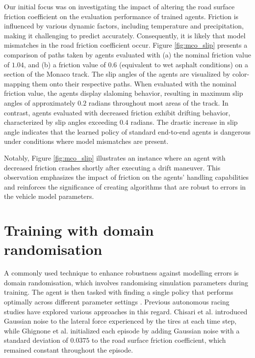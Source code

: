 Our initial focus was on investigating the impact of altering the road surface friction coefficient on the evaluation performance of trained agents.
Friction is influenced by various dynamic factors, including temperature and precipitation, making it challenging to predict accurately.
Consequently, it is likely that model mismatches in the road friction coefficient occur.
Figure \ref{fig:mco_slip} presents a comparison of paths taken by agents evaluated with (a) the nominal friction value of $1.04$, and (b) a friction value of $0.6$ (equivalent to wet asphalt conditions) on a section of the Monaco track. 
The slip angles of the agents are visualized by color-mapping them onto their respective paths. 
When evaluated with the nominal friction value, the agents display slaloming behavior, resulting in maximum slip angles of approximately $0.2$ radians throughout most areas of the track. 
In contrast, agents evaluated with decreased friction exhibit drifting behavior, characterized by slip angles exceeding $0.4$ radians. 
The drastic increase in slip angle indicates that the learned policy of standard end-to-end agents is dangerous under conditions where model mismatches are present.


Notably, Figure \ref{fig:mco_slip} illustrates an instance where an agent with decreased friction crashes shortly after executing a drift maneuver. 
This observation emphasizes the impact of friction on the agents' handling capabilities and reinforces the significance of creating algorithms that are robust to errors in the vehicle model parameters.




\section{Training with domain randomisation}

A commonly used technique to enhance robustness against modelling errors is domain randomisation, which involves randomising simulation parameters during training. 
The agent is then tasked with finding a single policy that performs optimally across different parameter settings \cite{Zhou2020}. 
Previous autonomous racing studies have explored various approaches in this regard. 
Chisari et al. \cite{Chisari2021} introduced Gaussian noise to the lateral force experienced by the tires at each time step, while Ghignone et al. \cite{Ghignone2022} initialized each episode by adding Gaussian noise with a standard deviation of $0.0375$ to the road surface friction coefficient, which remained constant throughout the episode.

